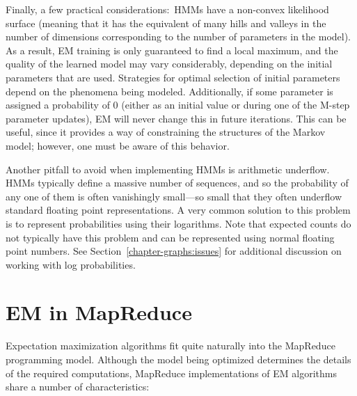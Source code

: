 Finally, a few practical considerations:\ HMMs have a non-convex
likelihood surface (meaning that it has the equivalent of many hills
and valleys in the number of dimensions corresponding to the number of
parameters in the model).  As a result, EM training is only guaranteed
to find a local maximum, and the quality of the learned model may vary
considerably, depending on the initial parameters that are used.
Strategies for optimal selection of initial parameters depend on the
phenomena being modeled.  Additionally, if some parameter is assigned
a probability of 0 (either as an initial value or during one of the
M-step parameter updates), EM will never change this in future
iterations.  This can be useful, since it provides a way of
constraining the structures of the Markov model; however, one must be
aware of this behavior.

Another pitfall to avoid when implementing HMMs is arithmetic
underflow.  HMMs typically define a massive number of sequences, and
so the probability of any one of them is often vanishingly small---so
small that they often underflow standard floating point
representations.  A very common solution to this problem is to
represent probabilities using their logarithms.  Note that expected
counts do not typically have this problem and can be represented using
normal floating point numbers.  See
Section~\ref{chapter-graphs:issues} for additional discussion on
working with log probabilities.

\section{EM in MapReduce}
\label{chapter6_mapreduce}

Expectation maximization algorithms fit quite naturally into the
MapReduce programming model.  Although the model being optimized
determines the details of the required computations, MapReduce
implementations of EM algorithms share a number of characteristics:

